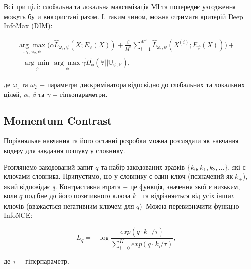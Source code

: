 Всі три цілі: глобальна та локальна максимізація МІ та попереднє узгодження можуть бути використані разом. І, таким чином, можна отримати критерій Deep InfoMax (DIM):

\begin{equation}\label{eq:deepinfomax}
\begin{aligned}
\underset{\omega_{1},\omega_{2},\psi}{\arg\max}(\alpha \hat{L}_{\omega_{1},\psi}(X; E_{\psi}(X)) + \frac{\beta}{M^{2}}\sum_{i=1}^{M^{2}}{\hat{L}_{\omega_{2}, \psi}(X^{(i)}; E_{\psi}(X)))} + \\
+ \underset{\psi}{\arg\min}\,\underset{\phi}{\arg\max}\gamma\hat{D}_{\phi}(\mathbb{V}||\mathbb{U_{\psi,P}}),
\end{aligned}
\end{equation}

\noindent де $\omega_{1}$ та $\omega_{2}$ $-$ параметри дискримінатора відповідно до глобальних \newline
\hspace*{15pt}та локальних цілей, \newline
\hspace*{15pt}$\alpha$, $\beta$ та $\gamma$ $-$ гіперпараметри.

\vspace{1.5em}

\subsection{Momentum Contrast}

Порівняльне навчання та його останні розробки можна розглядати як навчання кодеру для завдання пошуку у словнику.

Розглянемо закодований запит $q$ та набір закодованих зразків $\{k_{0}, k_{1}, k_{2}, \dots\}$, які є ключами словника. Припустимо, що у словнику є один ключ (позначений як $k_{+}$), який відповідає $q$. Контрастивна втрата $-$ це функція, значення якої є низьким, коли $q$ подібне до його позитивного ключа $k_{+}$ та відрізняється від усіх інших ключів (вважається негативним ключем для $q$). Можна перевизначити функцію InfoNCE:

\begin{equation}\label{eq:infonce_simple}
L_{q} = -\log{\frac{exp(q \cdot k_{+}/\tau)}{\sum_{i=0}^{K}{exp(q \cdot k_{i}/\tau)}}},
\end{equation}

\vspace{1.5em}

\noindent де $\tau$ $-$ гіперпараметр. 

